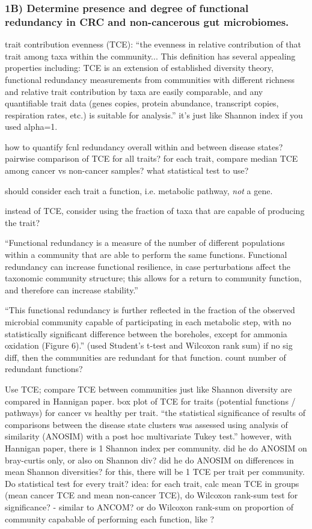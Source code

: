 \documentclass[11pt]{article}
\begin{document}
\subsubsection*{1B) Determine presence and degree of functional redundancy in CRC and non-cancerous gut microbiomes.}

trait contribution evenness (TCE): ``the evenness in relative contribution of that trait among taxa within the community... This definition has several appealing properties including: TCE is an extension of established diversity theory, functional redundancy measurements from communities with different richness and relative trait contribution by taxa are easily comparable, and any quantifiable trait data (genes copies, protein abundance, transcript copies, respiration rates, etc.) is suitable for analysis.'' \cite{royalty_quantitative_2020}
it's just like Shannon index if you used alpha=1.

how to quantify fcnl redundancy overall within and between disease states?
pairwise comparison of TCE for all traits?
for each trait, compare median TCE among cancer vs non-cancer samples?
what statistical test to use?

should consider each trait a function, i.e. metabolic pathway, \textit{not} a gene.

instead of TCE, consider using the fraction of taxa that are capable of producing the trait?

``Functional redundancy is a measure of the number of different populations within a community that are able to perform the same functions. Functional redundancy can increase functional resilience, in case perturbations affect the taxonomic community structure; this allows for a return to community function, and therefore can increase stability.'' \cite{heintz-buschart_human_2018}

``This functional redundancy is further reflected in the fraction of the observed microbial community capable of participating in each metabolic step, with no statistically significant difference between the boreholes, except for ammonia oxidation (Figure 6).'' (used Student's t-test and Wilcoxon rank sum) \cite{tully_dynamic_2018}
if no sig diff, then the communities are redundant for that function. count number of redundant functions?

Use TCE; compare TCE between communities just like Shannon diversity are compared in Hannigan paper. box plot of TCE for traits (potential functions / pathways) for cancer vs healthy per trait. ``the statistical significance of results of comparisons between the disease state clusters was assessed using analysis of similarity (ANOSIM) with a post hoc multivariate Tukey test.'' \cite{hannigan_diagnostic_2018}
however, with Hannigan paper, there is 1 Shannon index per community. did he do ANOSIM on bray-curtis only, or also on Shannon div? did he do ANOSIM on differences in mean Shannon diversities?
for this, there will be 1 TCE per trait per community. Do statistical test for every trait?
idea: for each trait, calc mean TCE in groups (mean cancer TCE and mean non-cancer TCE), do Wilcoxon rank-sum test for significance? - similar to ANCOM? 
or do Wilcoxon rank-sum on proportion of community capabable of performing each function, like \cite{tully_dynamic_2018}?
\end{document}
